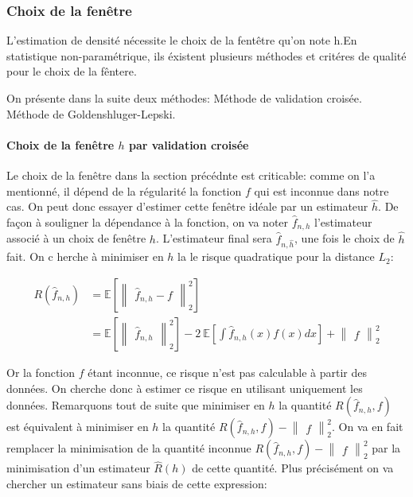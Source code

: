 \documentclass[
]{article}
\begin{document}
\subsubsection{Choix de la fenêtre}

L'estimation de densité nécessite le choix de la fentêtre qu'on note
h.\newline En statistique non-paramétrique, ils éxistent plusieurs
méthodes et critéres de qualité pour le choix de la fêntere.\newline

On présente dans la suite deux méthodes:\newline \hspace*{0.5cm} Méthode
de validation croisée.\newline \hspace*{0.5cm} Méthode de
Goldenshluger-Lepski.\newline

\paragraph{Choix de la fenêtre $h$ par validation croisée}

Le choix de la fenêtre dans la section précédnte est criticable: comme
on l'a mentionné, il dépend de la régularité la fonction \(f\) qui est
inconnue dans notre cas. On peut donc essayer d'estimer cette fenêtre
idéale par un estimateur \(\hat {h}\). De façon à souligner la
dépendance à la fonction, on va noter \(\hat {f}_{n,h}\) l'estimateur
associé à un choix de fenêtre \(h\). L'estimateur final sera
\(\hat{f}_{n,\hat{h}}\), une fois le choix de \(\hat{h}\) fait.\newline
On c herche à minimiser en \(h\) la le risque quadratique pour la
distance \(L_2\):

\[
\begin{aligned}
R(\hat {f}_{n,h})&=\mathbb{E}[\begin{Vmatrix}\hat {f}_{n,h}-f\end{Vmatrix}_2^2]\\        
&= \mathbb{E}[\begin{Vmatrix}\hat {f}_{n,h}\end{Vmatrix}_2^2] -2~\mathbb{E}[\int \hat {f}_{n,h}(x)f(x)dx] +\begin{Vmatrix}f\end{Vmatrix}_2^2
\end{aligned}
\]

Or la fonction \(f\) étant inconnue, ce risque n'est pas calculable à
partir des données. On cherche donc à estimer ce risque en utilisant
uniquement les données. Remarquons tout de suite que minimiser en \(h\)
la quantité \(R(\hat {f}_{n,h}, f)\) est équivalent à minimiser en \(h\)
la quantité \(R(\hat {f}_{n,h}, f)-\begin{Vmatrix}f\end{Vmatrix}_2^2\).
On va en fait remplacer la minimisation de la quantité inconnue
\(R(\hat {f}_{n,h}, f)-\begin{Vmatrix}f\end{Vmatrix}_2^2\) par la
minimisation d'un estimateur \(\hat {R}(h)\) de cette quantité. Plus
précisément on va chercher un estimateur sans biais de cette expression:
\end{document}
